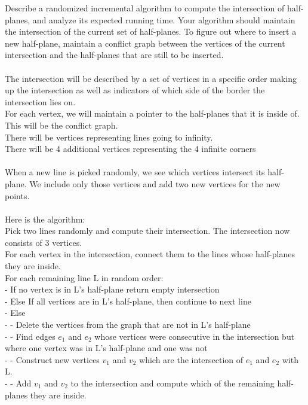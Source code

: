 \documentclass[11pt,psfig]{article}
\begin{document}
Describe a randomized incremental algorithm to compute the intersection
of half-planes, and analyze its expected running time. Your algorithm
should maintain the intersection of the current set of half-planes.
To figure out where to insert a new half-plane, maintain a conflict graph
between the vertices of the current intersection and the half-planes that
are still to be inserted.\\
\\
The intersection will be described by a set of vertices in a specific order making up the intersection as well as indicators of which side of the border the intersection lies on. \\
For each vertex, we will maintain a pointer to the half-planes that it is inside of. This will be the conflict graph. \\
There will be vertices representing lines going to infinity.\\
There will be 4 additional vertices representing the 4 infinite corners\\
\\
When a new line is picked randomly, we see which vertices intersect its half-plane. We include only those vertices and add two new vertices for the new points. \\
\\
Here is the algorithm:\\
Pick two lines randomly and compute their intersection. The intersection now consists of 3 vertices. \\
For each vertex in the intersection, connect them to the lines whose half-planes they are inside. \\
For each remaining line L in random order:\\
- If no vertex is in L's half-plane return empty intersection\\
- Else If all vertices are in L's half-plane, then continue to next line\\
- Else \\
- - Delete the vertices from the graph that are not in L's half-plane\\
- - Find edges $e_1$ and $e_2$ whose vertices were consecutive in the intersection but where one vertex was in L's half-plane and one was not\\
- - Construct new vertices $v_1$ and $v_2$ which are the intersection of $e_1$ and $e_2$ with L. \\
- - Add $v_1$ and $v_2$ to the intersection and compute which of the remaining half-planes they are inside. \\
\end{document}
